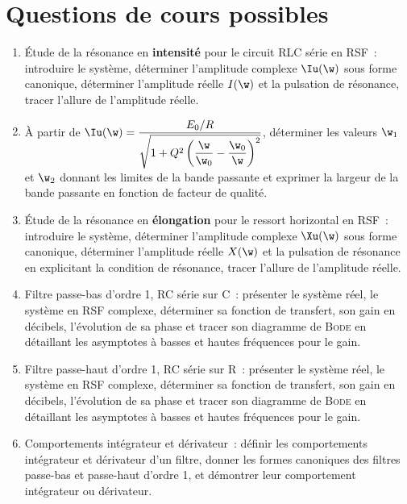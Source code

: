 \documentclass[a4paper, 12pt, final, garamond]{book}
\begin{document}

\section{Questions de cours possibles}
\begin{enumerate}
    \item Étude de la résonance en \textbf{intensité} pour le circuit RLC série
        en RSF~: introduire le système, déterminer l'amplitude complexe
        $\Iu(\w)$ sous forme canonique, déterminer l'amplitude réelle $I(\w)$ et
        la pulsation de résonance, tracer l'allure de l'amplitude réelle.

    \item À partir de $\Iu(\w) = 
        \dfrac{E_0/R}{\sqrt{1 + Q^2\left( \dfrac{\w}{\w_0} - \dfrac{\w_0}{\w}
        \right)^2}}$, déterminer les valeurs $\w_1$ et $\w_2$ donnant
        les limites de la bande passante et exprimer la largeur de la
        bande passante en fonction de facteur de qualité.

    \item Étude de la résonance en \textbf{élongation} pour le ressort
        horizontal en RSF~: introduire le système, déterminer l'amplitude
        complexe $\Xu(\w)$ sous forme canonique, déterminer l'amplitude réelle
        $X(\w)$ et la pulsation de résonance en explicitant la condition de
        résonance, tracer l'allure de l'amplitude réelle.

    \item Filtre passe-bas d'ordre 1, RC série sur C~: présenter le système
        réel, le système en RSF complexe, déterminer sa fonction de transfert,
        son gain en décibels, l'évolution de sa phase et tracer son diagramme de
        \textsc{Bode} en détaillant les asymptotes à basses et hautes fréquences
        pour le gain.

    \item Filtre passe-haut d'ordre 1, RC série sur R~: présenter le système
        réel, le système en RSF complexe, déterminer sa fonction de transfert,
        son gain en décibels, l'évolution de sa phase et tracer son diagramme de
        \textsc{Bode} en détaillant les asymptotes à basses et hautes fréquences
        pour le gain.

    \item Comportements intégrateur et dérivateur~: définir les comportements
        intégrateur et dérivateur d'un filtre, donner les formes canoniques
        des filtres passe-bas et passe-haut d'ordre 1, et démontrer leur
        comportement intégrateur ou dérivateur.


\end{enumerate}
\end{document}
